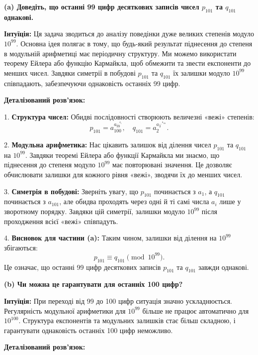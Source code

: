 \documentclass{article}
\begin{document}
\textbf{(a) Доведіть, що останні 99 цифр десяткових записів чисел \( p_{101} \) та \( q_{101} \) однакові.}

\textbf{Інтуїція:}  
Ця задача зводиться до аналізу поведінки дуже великих степенів модуло \( 10^{99} \). Основна ідея полягає в тому, що будь-який результат піднесення до степеня в модульній арифметиці має періодичну структуру. Ми можемо використати теорему Ейлера або функцію Кармайкла, щоб обмежити та звести експоненти до менших чисел. Завдяки симетрії в побудові \( p_{101} \) та \( q_{101} \) їх залишки модуло \( 10^{99} \) співпадають, забезпечуючи однаковість останніх 99 цифр.

\textbf{Деталізований розв'язок:}

1. \textbf{Структура чисел:}  
   Обидві послідовності створюють величезні «вежі» степенів:
   \[
   p_{101} = a_{100}^{a_{99}^{\dots^{a_1}}}, \quad q_{101} = a_2^{a_3^{\dots^{a_{101}}}}.
   \]

2. \textbf{Модульна арифметика:}  
   Нас цікавить залишок від ділення чисел \( p_{101} \) та \( q_{101} \) на \( 10^{99} \). Завдяки теоремі Ейлера або функції Кармайкла ми знаємо, що піднесення до степеня модуло \( 10^{99} \) має повторювані значення. Це дозволяє обчислювати залишки для кожного рівня «вежі», зводячи їх до менших чисел.

3. \textbf{Симетрія в побудові:}  
   Зверніть увагу, що \( p_{101} \) починається з \( a_1 \), а \( q_{101} \) починається з \( a_{101} \), але обидва проходять через одні й ті самі числа \( a_i \) лише у зворотному порядку. Завдяки цій симетрії, залишки модуло \( 10^{99} \) після проходження всієї «вежі» співпадуть.

4. \textbf{Висновок для частини (a):}  
   Таким чином, залишки від ділення на \( 10^{99} \) збігаються:
   \[
   p_{101} \equiv q_{101} \pmod{10^{99}}.
   \]
   Це означає, що останні 99 цифр десяткових записів \( p_{101} \) та \( q_{101} \) завжди однакові.

\bigskip

\textbf{(b) Чи можна це гарантувати для останніх 100 цифр?}

\textbf{Інтуїція:}  
При переході від 99 до 100 цифр ситуація значно ускладнюється. Регулярність модульної арифметики для \( 10^{99} \) більше не працює автоматично для \( 10^{100} \). Структура експонентів та модульних залишків стає більш складною, і гарантувати однаковість останніх 100 цифр неможливо.

\textbf{Деталізований розв'язок:}
\end{document}
